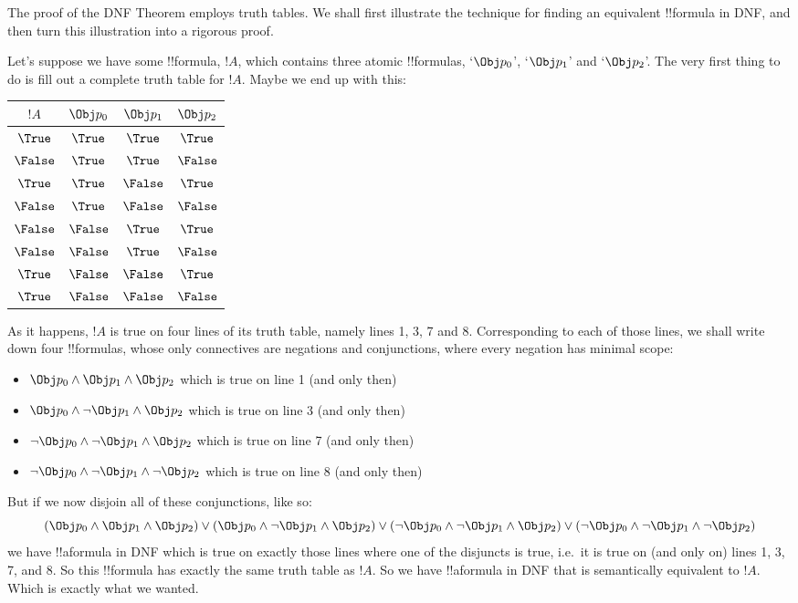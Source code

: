 \documentclass[../../../include/open-logic-section]{subfiles}
\begin{document}
The proof of the DNF Theorem employs truth tables. We shall first illustrate the technique for finding an equivalent !!{formula} in DNF, and then turn this illustration into a rigorous proof. 

Let's suppose we have some !!{formula}, $!A$, which contains three atomic !!{formula}s, `$\Obj p_0$', `$\Obj p_1$' and `$\Obj p_2$'. The very first thing to do is fill out a complete truth table for $!A$. Maybe we end up with this:
\begin{center}
\begin{tabular}{|c||c|c|c|}
\hline
$!A$ & $\Obj p_0$ & $\Obj p_1$ & ${\Obj p_2}$\\
\hline \hline
 $\True$& $\True$ & $\True$ & $\True$ \\
 $\False$&$\True$ & $\True$ & $\False$ \\
 $\True$&$\True$ & $\False$ & $\True$ \\
 $\False$&$\True$ & $\False$ & $\False$ \\
 $\False$&$\False$ & $\True$ & $\True$ \\
 $\False$&$\False$ & $\True$ & $\False$ \\
 $\True$&$\False$ & $\False$ & $\True$ \\
 $\True$&$\False$ & $\False$ & $\False$ \\
 \hline
\end{tabular}
\end{center}

As it happens, $!A$ is true on four lines of its truth table, namely lines 1, 3, 7 and 8. Corresponding to each of those lines, we shall write down four !!{formula}s, whose only connectives are negations and conjunctions, where every negation has minimal scope:
	\begin{itemize}
		\item  $\Obj p_0 \land \Obj p_1 \land \Obj p_2$ \hfill which is true on line 1 (and only then)
		\item $\Obj p_0 \land \lnot \Obj p_1 \land \Obj p_2$ \hfill which is true on line 3 (and only then)
		\item $\lnot \Obj p_0 \land \lnot \Obj p_1 \land \Obj p_2$ \hfill which is true on line 7 (and only then)
		\item $\lnot \Obj p_0 \land \lnot \Obj p_1 \land \lnot \Obj p_2$ \hfill which is true on line 8 (and only then)
	\end{itemize}

But if we now disjoin all of these conjunctions, like so:
$$(\Obj p_0 \land \Obj p_1 \land \Obj p_2) \lor (\Obj p_0 \land \lnot \Obj p_1 \land \Obj p_2) \lor (\lnot \Obj p_0 \land \lnot \Obj p_1 \land \Obj p_2) \lor (\lnot \Obj p_0 \land \lnot \Obj p_1 \land \lnot \Obj p_2)$$
we have !!a{formula} in DNF which is true on exactly those lines where one of the disjuncts is true, i.e.\ it is true on (and only on) lines 1, 3, 7, and 8. So this !!{formula} has exactly the same truth table as $!A$. So we have !!a{formula} in DNF that is semantically equivalent to $!A$. Which is exactly what we wanted.
\end{document}
